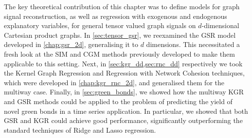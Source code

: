 The key theoretical contribution of this chapter was to define models for graph signal reconstruction, as well as regression with exogenous and endogenous explanatory variables, for general tensor valued graph signals on $d$-dimensional Cartesian product graphs. In \cref{sec:tensor_gsr}, we reexamined the GSR model developed in \cref{chap:gsr_2d}, generalising it to $d$ dimensions. This necessitated a fresh look at the SIM and CGM methods previously developed to make them applicable to this setting. Next, in \cref{sec:kgr_dd,sec:rnc_dd} respectively we took the Kernel Graph Regression and Regression with Network Cohesion techniques, which were developed in \cref{chap:kgr_rnc_2d}, and generalised them for the multiway case. Finally, in \cref{sec:green_bonds}, we showed how the multiway KGR and GSR methods could be applied to the problem of predicting the yield of novel green bonds in a time series application. In particular, we showed that both GSR and KGR could achieve good performance, significantly outperforming the standard techniques of Ridge and Lasso regression. 

